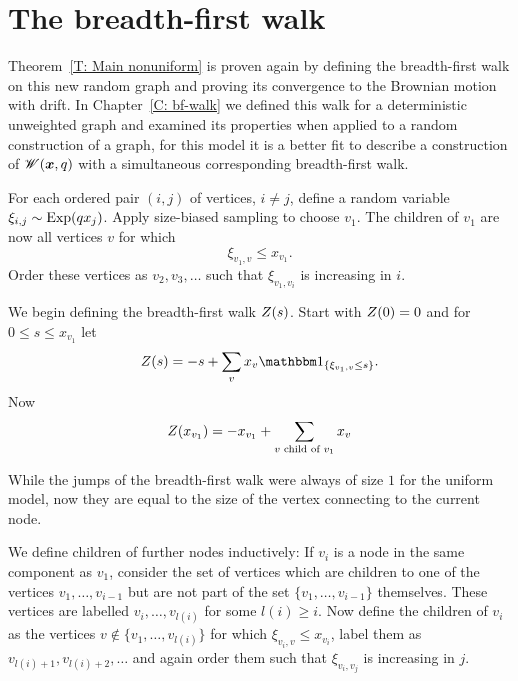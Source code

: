 \section{The breadth-first walk}

Theorem~\ref{T: Main nonuniform} is proven again by defining the breadth-first walk on this new random graph
and proving its convergence to the Brownian motion with drift.
In Chapter~\ref{C: bf-walk} we defined this walk for a deterministic unweighted graph 
and examined its properties when applied to a random construction of a graph,
for this model it is a better fit to describe a construction of $\mathscr{W}(\boldsymbol{x}, q)$ with a simultaneous corresponding breadth-first walk.

For each ordered pair $(i, j)$ of vertices, $i \neq j$, define a random variable $\xi_{i,j} \sim \operatorname*{Exp}(q x_j)$.
Apply size-biased sampling to choose $v_1$.
The children of $v_1$ are now all vertices $v$ for which
\begin{equation}
	\xi_{v_1, v} \leq x_{v_1}.
\end{equation}
Order these vertices as $v_2, v_3, \dots$ such that $\xi_{v_1, v_i}$ is increasing in $i$.

We begin defining the breadth-first walk $Z(s)$.
Start with $Z(0) = 0$ and for $0 \leq s \leq x_{v_1}$ let
\begin{equation}
	\bfw(s) = -s + \sum_{v} x_v \Ind{\{\xi_{v_1, v} \leq s\}}.
\end{equation}
Now
\begin{equation}
	Z(x_{v_1}) = -x_{v_1} + \sum_{\text{$v$ child of $v_1$}} x_v
\end{equation}


While the jumps of the breadth-first walk were always of size $1$ for the uniform model,
now they are equal to the size of the vertex connecting to the current node.

We define children of further nodes inductively:
If $v_i$ is a node in the same component as $v_1$,
consider the set of vertices which are children to one of the vertices $v_1, \dots, v_{i-1}$
but are not part of the set $\{v_1, \dots, v_{i-1}\}$ themselves.
These vertices are labelled $v_i, \dots, v_{l(i)}$ for some $l(i) \geq i$.
Now define the children of $v_i$ as the vertices 
$v \notin \{v_1, \dots, v_{l(i)}\}$ for which $\xi_{v_i, v} \leq x_{v_i}$,
label them as $v_{l(i) + 1}, v_{l(i) + 2}, \dots$ 
and again order them such that $\xi_{v_i, v_j}$ is increasing in $j$.
 
